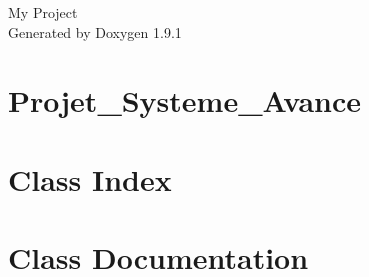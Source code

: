 \let\mypdfximage\pdfximage\def\pdfximage{\immediate\mypdfximage}\documentclass[twoside]{book}
\newcommand{\+}{\discretionary{\mbox{\scriptsize$\hookleftarrow$}}{}{}}
\newcommand{\clearemptydoublepage}{%
  \newpage{\pagestyle{empty}\cleardoublepage}%
}
\begin{document}
\raggedbottom

\hypersetup{pageanchor=false,
             bookmarksnumbered=true,
             pdfencoding=unicode
            }
\begin{titlepage}
\vspace*{7cm}
\begin{center}%
{\Large My Project }\\
\vspace*{1cm}
{\large Generated by Doxygen 1.9.1}\\
\end{center}
\end{titlepage}
\clearemptydoublepage
{}
\tableofcontents
\clearemptydoublepage
{}
\hypersetup{pageanchor=true}

\chapter{Projet\+\_\+\+Systeme\+\_\+\+Avance}
\label{md_README}

\chapter{Class Index}

\chapter{Class Documentation}



\backmatter
\newpage
{}
\clearemptydoublepage
{}
\printindex
\end{document}
